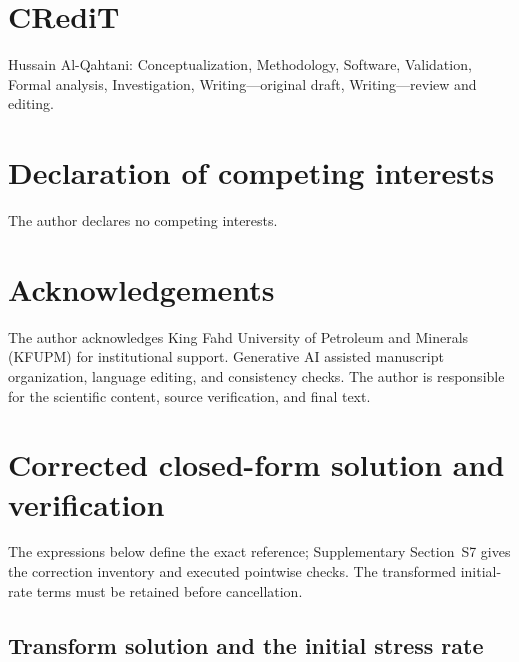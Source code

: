 \documentclass[11pt]{article}
\begin{document}
\section*{CRediT}
Hussain Al-Qahtani: Conceptualization, Methodology, Software, Validation,
Formal analysis, Investigation, Writing---original draft,
Writing---review and editing.

\section*{Declaration of competing interests}
The author declares no competing interests.

\section*{Acknowledgements}
The author acknowledges King Fahd University of Petroleum and Minerals
(KFUPM) for institutional support. Generative AI assisted manuscript
organization, language editing, and consistency checks. The author is
responsible for the scientific content, source verification, and final text.

\appendix
\section{Corrected closed-form solution and verification}
\label{app:exact}

The expressions below define the exact reference; Supplementary
Section~S7 gives the correction inventory and executed pointwise checks.
The transformed initial-rate terms must be retained before cancellation.

\subsection{Transform solution and the initial stress rate}
\end{document}

